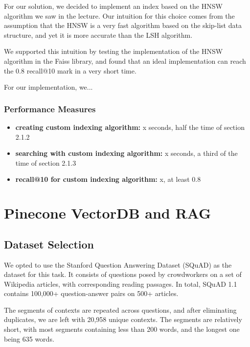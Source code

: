 \documentclass[12pt]{article}
\begin{document}
For our solution, we decided to implement an index based on the HNSW algorithm we saw in the lecture. 
Our intuition for this choice comes from the assumption that the HNSW is a very fast algorithm based on the skip-list data structure, and yet it is more accurate than the LSH algorithm.

We supported this intuition by testing the implementation of the HNSW algorithm in the Faiss library, and found that an ideal implementation can reach the 0.8 recall@10 mark in a very short time.

For our implementation, we...

\subsubsection*{Performance Measures}

\begin{itemize}
    \item \textbf{creating custom indexing algorithm:} x seconds, half the time of section 2.1.2
    \item \textbf{searching with custom indexing algorithm:} x seconds, a third of the time of section 2.1.3
    \item \textbf{recall@10 for custom indexing algorithm:} x, at least 0.8
\end{itemize}



\newpage

\section{Pinecone VectorDB and RAG}

\subsection{Dataset Selection}

We opted to use the Stanford Question Answering Dataset (SQuAD) as the dataset for this task. 
It consists of questions posed by crowdworkers on a set of Wikipedia articles, with corresponding reading passages.
In total, SQuAD 1.1 contains 100,000+ question-answer pairs on 500+ articles.

The segments of contexts are repeated across questions, and after eliminating duplicates, we are left with 20,958 unique contexts.
The segments are relatively short, with most segments containing less than 200 words, and the longest one being 635 words.
\end{document}
